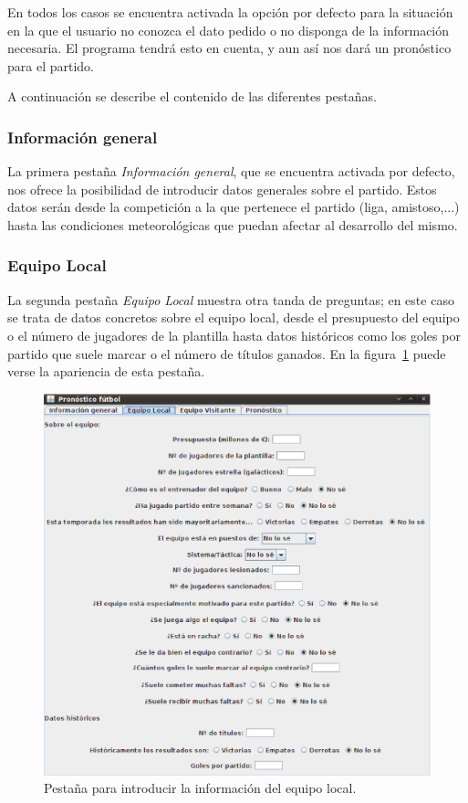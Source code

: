 \documentclass[a4paper,12pt]{article}
\begin{document}
En todos los casos se encuentra activada la opción por defecto para la situación en la que el usuario no conozca el dato pedido o no disponga de la información necesaria.
El programa tendrá esto en cuenta, y aun así nos dará un pronóstico para el partido.
\\\par
A continuación se describe el contenido de las diferentes pestañas.

\subsubsection{Información general}
La primera pestaña \textit{Información general}, que se encuentra activada por defecto, nos ofrece la posibilidad de introducir datos generales sobre el partido.
Estos datos serán desde la competición a la que pertenece el partido (liga, amistoso,...) hasta las condiciones meteorológicas que puedan afectar al desarrollo del mismo.

\subsubsection{Equipo Local}
La segunda pestaña \textit{Equipo Local} muestra otra tanda de preguntas; en este caso se trata de datos concretos sobre el equipo local,
desde el presupuesto del equipo o el número de jugadores de la plantilla hasta datos históricos como los goles por partido que suele marcar o el número de títulos ganados.
En la figura~\ref{fig:p2} puede verse la apariencia de esta pestaña.
\begin{figure}[h]
 \begin{center}
  \includegraphics[scale=0.4]{p2.eps}
\caption{Pestaña para introducir la información del equipo local.}
\label{fig:p2}
 \end{center}
\end{figure} 
\end{document}
